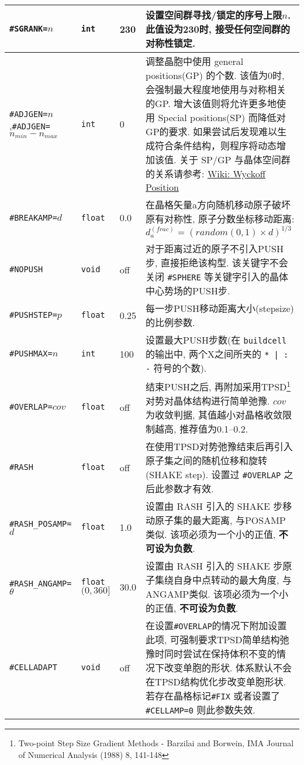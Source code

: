 \documentclass[a4paper, 10pt]{article}
\begin{document}
\begin{center}
\begin{longtable}{m{10em}|m{4em}<{\centering}|m{3em}<{\centering}|m{15em}}
\midrule
\verb|#SGRANK=|\(n\) & \verb|int| & 230 & 设置空间群寻找/锁定的序号上限\(n\). 此值设为230时, 接受任何空间群的对称性锁定.\\
\midrule
\verb|#ADJGEN=|\(n\),\hspace{4em}\verb|#ADJGEN=|\(n_{min}-n_{max}\)  & \verb|int|  & 0 & 调整晶胞中使用 general positions(GP) 的个数. 该值为0时, 会强制最大程度地使用与对称相关的GP. 增大该值则将允许更多地使用 Special positions(SP) 而降低对GP的要求. 如果尝试后发现难以生成符合条件结构，则程序将动态增加该值. 关于 SP/GP 与晶体空间群的关系请参考: \href{https://en.wikipedia.org/wiki/Wyckoff_positions}{Wiki: Wyckoff Position}\\
\midrule
\verb|#BREAKAMP=|\(d\) & \verb|float| & 0.0 & 在晶格矢量a方向随机移动原子破坏原有对称性, 原子分数坐标移动距离: \(d^{(frac)}_a=(random(0,1)\times{}d)^{1/3}\)\\
\midrule
\verb|#NOPUSH|& \verb|void| & off & 对于距离过近的原子不引入PUSH步, 直接拒绝该构型. 该关键字不会关闭 \verb|#SPHERE| 等关键字引入的晶体中心势场的PUSH步.\\
\midrule
\verb|#PUSHSTEP=|\(p\)& \verb|float| & 0.25 & 每一步PUSH移动距离大小(stepsize)的比例参数.\\
\midrule
\verb|#PUSHMAX=|\(n\)& \verb|int| & 100 &设置最大PUSH步数(在 \verb|buildcell| 的输出中, 两个X之间所夹的 \verb!* | : -! 符号的个数).\\
\midrule
\verb|#OVERLAP=|\(cov\)& \verb|float| & off & 结束PUSH之后, 再附加采用TPSD\footnote{Two-point Step Size Gradient Methods - Barzilai and Borwein, IMA Journal of Numerical Analysis (1988) 8, 141-148}对势对晶体结构进行简单弛豫. \(cov\)为收敛判据, 其值越小对晶格收敛限制越高, 推荐值为0.1--0.2.\\
\midrule
\verb|#RASH|& \verb|float| & off & 在使用TPSD对势弛豫结束后再引入原子集之间的随机位移和旋转(SHAKE step). 设置过 \verb|#OVERLAP| 之后此参数才有效.\\
\midrule
\verb|#RASH_POSAMP=|\(d\)& \verb|float| & 1.0 & 设置由 RASH 引入的 SHAKE 步移动原子集的最大距离, 与POSAMP类似. 该项必须为一个小的正值, \textbf{不可设为负数}.\\
\midrule
\verb|#RASH_ANGAMP=|\(\theta\) & \verb|float| \((0,360]\) & 30.0 & 设置由 RASH 引入的 SHAKE 步原子集绕自身中点转动的最大角度, 与ANGAMP类似. 该项必须为一个小的正值, \textbf{不可设为负数}.\\
\midrule
\verb|#CELLADAPT|& \verb|void| & off & 在设置\verb|#OVERLAP|的情况下附加设置此项, 可强制要求TPSD简单结构弛豫时同时尝试在保持体积不变的情况下改变单胞的形状. 体系默认不会在TPSD结构优化步改变单胞形状. 若存在晶格标记\verb|#FIX| 或者设置了 \verb|#CELLAMP=0| 则此参数失效. \\

\end{longtable}
\end{center}
\end{document}
